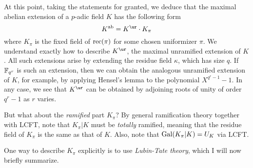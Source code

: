 At this point, taking the statements for granted, we deduce that the maximal abelian extension of a $p$-adic field $K$ has the following form
\[ K^{\ab} = K^{\ur} \cdot K_{\pi} \]
where $K_{\pi}$ is the fixed field of $\operatorname{rec}(\pi)$ for some chosen uniformizer $\pi$.
We understand exactly how to describe $K^{\ur}$, the maximal unramified extension of $K$.
All such extensions arise by extending the residue field $\kappa$, which has size $q$.
If $\mathbb{F}_{q^{r}}$ is such an extension, then we can obtain the analogous unramified extension of $K$, for example, by applying Hensel's lemma to the polynomial $X^{q^{r}-1}-1$.
In any case, we see that $K^{\ur}$ can be obtained by adjoining roots of unity of order $q^{r}-1$ as $r$ varies.

But what about the \emph{ramified} part $K_{\pi}$?
By general ramification theory together with LCFT, note that $K_{\pi}|K$ must be \emph{totally} ramified, meaning that the residue field of $K_{\pi}$ is the same as that of $K$.
Also, note that $\operatorname{Gal}(K_{\pi}|K) = U_{K}$ via LCFT.

One way to describe $K_{\pi}$ explicitly is to use \emph{Lubin-Tate theory}, which I will now briefly summarize.

